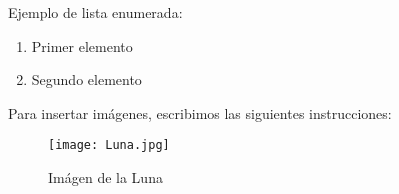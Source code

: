 \documentclass{article}
\begin{document}
Ejemplo de lista enumerada:
\begin{enumerate}
\item {Primer elemento}
\item {Segundo elemento}
\end{enumerate}
 
 
Para insertar imágenes, escribimos las siguientes instrucciones:

\begin{center} 
\begin{figure}
    \centering
    \texttt{[image: Luna.jpg]}
    \caption{Imágen de la Luna} 
\end{figure}   
\end{center}

\end{document}
